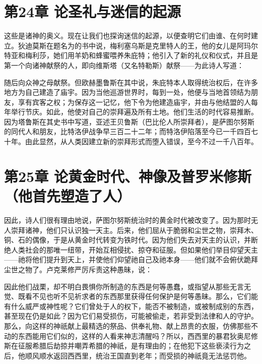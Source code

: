 \section{第24章 论圣礼与迷信的起源}

这些是诸神的奥义。现在让我们也探询迷信的起源，以便查明它们由谁、在何时建立。狄迪莫斯在题名为的书中说，梅利塞乌斯是克里特人的王，他的女儿是阿玛尔特亚和梅利莎，她们用羊奶和蜂蜜喂养朱庇特；他引入了新的礼仪和仪式，并且是第一个向诸神献祭的人，即向维斯塔（又名特勒斯）献祭——为此诗人写道：\par

\par

随后向众神之母献祭。但欧赫墨鲁斯在其中说，朱庇特本人取得统治权后，在许多地方为自己建造了庙宇。因为当他巡游世界时，每到一处，他便与当地首领结为朋友，享有宾客之权；为保存这一记忆，他下令为他建造庙宇，并由与他结盟的人每年举行节庆。如此，他使对自己的崇拜遍及所有土地。他们生活的时代容易推断。因为塔鲁斯在其史书中写道，亚述王贝鲁斯（巴比伦人所崇拜者），是萨图尔努斯的同代人和朋友，比特洛伊战争早三百二十二年；而特洛伊陷落至今已一千四百七十年。由此显然，从人类因建立新的崇拜形式而堕入错误，至今不过一千八百年。\par


\section{第25章 论黄金时代、神像及普罗米修斯（他首先塑造了人）}

因此，诗人们很有理由地说，萨图尔努斯统治时的黄金时代被改变了。因为那时无人崇拜诸神，他们只认识独一天主。后来，他们屈从于脆弱和尘世之物，崇拜木、铜、石的偶像，于是从黄金时代转变为铁时代。因为他们失去对天主的认识，并断绝人类社会的那唯一纽带，开始互相侵扰、掠夺和征服。但如果他们举目仰望天主——祂将他们提升到天上，并使他们仰望祂自己及祂本身——他们就不会俯伏跪拜尘世之物了。卢克莱修严厉斥责这种愚昧，说：\par

\par

因此他们战栗，却不明白畏惧你所制造的东西是何等愚蠢，或指望从那些无言无觉、既看不见也听不见祈求者的东西那里获得任何保护是何等愚昧。那么，它们能有什么威严或神性呢？它们曾处于人的权下，能否不被制造，或被制成别的东西，甚至现在仍是如此？因为它们易受损伤，可能被偷走，若非受到法律和人的守护。那么，向这样的神祇献上最精选的祭品、供奉礼物、献上昂贵的衣服，仿佛那些不动的东西能用它们似的，这样的人看来神志清醒吗？所以，西西里的暴君狄奥尼修斯在征服希腊后劫掠并嘲弄希腊的神祇，是有理由的；在他犯下这些亵渎行为之后，他顺风顺水返回西西里，统治王国直到老年；而受损的神祇竟无法惩罚他。\par

